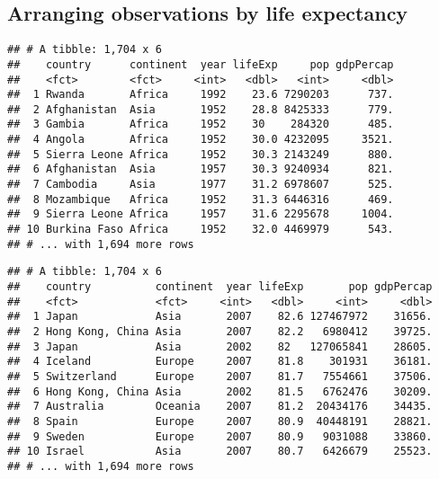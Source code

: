 \documentclass[]{article}
\newenvironment{Shaded}{\begin{snugshade}}{\end{snugshade}}
\newcommand{\KeywordTok}[1]{\textcolor[rgb]{0.13,0.29,0.53}{\textbf{#1}}}
\newcommand{\StringTok}[1]{\textcolor[rgb]{0.31,0.60,0.02}{#1}}
\newcommand{\CommentTok}[1]{\textcolor[rgb]{0.56,0.35,0.01}{\textit{#1}}}
\newcommand{\OperatorTok}[1]{\textcolor[rgb]{0.81,0.36,0.00}{\textbf{#1}}}
\newcommand{\NormalTok}[1]{#1}
\begin{document}
\subsection{Arranging observations by life
expectancy}\label{arranging-observations-by-life-expectancy}

\begin{Shaded}
\end{Shaded}

\begin{verbatim}
## # A tibble: 1,704 x 6
##    country      continent  year lifeExp     pop gdpPercap
##    <fct>        <fct>     <int>   <dbl>   <int>     <dbl>
##  1 Rwanda       Africa     1992    23.6 7290203      737.
##  2 Afghanistan  Asia       1952    28.8 8425333      779.
##  3 Gambia       Africa     1952    30    284320      485.
##  4 Angola       Africa     1952    30.0 4232095     3521.
##  5 Sierra Leone Africa     1952    30.3 2143249      880.
##  6 Afghanistan  Asia       1957    30.3 9240934      821.
##  7 Cambodia     Asia       1977    31.2 6978607      525.
##  8 Mozambique   Africa     1952    31.3 6446316      469.
##  9 Sierra Leone Africa     1957    31.6 2295678     1004.
## 10 Burkina Faso Africa     1952    32.0 4469979      543.
## # ... with 1,694 more rows
\end{verbatim}

\begin{Shaded}
\end{Shaded}

\begin{verbatim}
## # A tibble: 1,704 x 6
##    country          continent  year lifeExp       pop gdpPercap
##    <fct>            <fct>     <int>   <dbl>     <int>     <dbl>
##  1 Japan            Asia       2007    82.6 127467972    31656.
##  2 Hong Kong, China Asia       2007    82.2   6980412    39725.
##  3 Japan            Asia       2002    82   127065841    28605.
##  4 Iceland          Europe     2007    81.8    301931    36181.
##  5 Switzerland      Europe     2007    81.7   7554661    37506.
##  6 Hong Kong, China Asia       2002    81.5   6762476    30209.
##  7 Australia        Oceania    2007    81.2  20434176    34435.
##  8 Spain            Europe     2007    80.9  40448191    28821.
##  9 Sweden           Europe     2007    80.9   9031088    33860.
## 10 Israel           Asia       2007    80.7   6426679    25523.
## # ... with 1,694 more rows
\end{verbatim}
\end{document}
